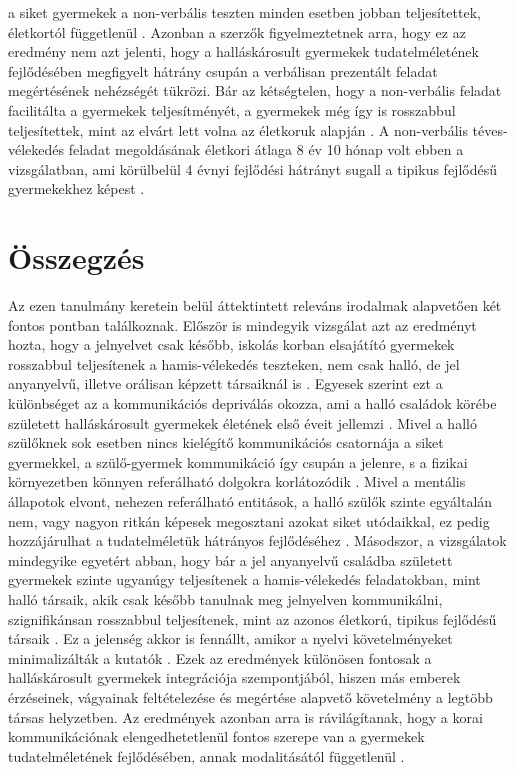 a siket gyermekek a non-verbális teszten minden esetben jobban teljesítettek, életkortól
függetlenül \autocite{figueras-costa_harris_2001}. Azonban a szerzők figyelmeztetnek arra, hogy ez az eredmény nem azt
jelenti, hogy a halláskárosult gyermekek tudatelméletének fejlődésében megfigyelt hátrány
csupán a verbálisan prezentált feladat megértésének nehézségét tükrözi. Bár az kétségtelen,
hogy a non-verbális feladat facilitálta a gyermekek teljesítményét, a gyermekek még így is
rosszabbul teljesítettek, mint az elvárt lett volna az életkoruk alapján \autocite{figueras-costa_harris_2001}. A non-verbális
téves-vélekedés feladat megoldásának életkori átlaga 8 év 10 hónap volt ebben a vizsgálatban,
ami körülbelül 4 évnyi fejlődési hátrányt sugall a tipikus fejlődésű gyermekekhez képest
\autocite{figueras-costa_harris_2001}.

\pagebreak

\section*{Összegzés}

Az ezen tanulmány keretein belül áttektintett releváns irodalmak alapvetően két fontos
pontban találkoznak. Először is mindegyik vizsgálat azt az eredményt hozta, hogy a jelnyelvet
csak később, iskolás korban elsajátító gyermekek rosszabbul teljesítenek a hamis-vélekedés
teszteken, nem csak halló, de jel anyanyelvű, illetve orálisan képzett társaiknál is \autocite{peterson_slaughter_2006,woolfe_want_siegal_2002,peterson_siegal_1999}.
Egyesek szerint ezt a különbséget az a kommunikációs depriválás okozza, ami a halló
családok körébe született halláskárosult gyermekek életének első éveit jellemzi \autocite{perner_leekam_wimmer_1987}. Mivel a
halló szülőknek sok esetben nincs kielégítő kommunikációs csatornája a siket gyermekkel, a
szülő-gyermek kommunikáció így csupán a jelenre, s a fizikai környezetben könnyen
referálható dolgokra korlátozódik \autocite{peterson_siegal_2000}. Mivel a mentális állapotok elvont, nehezen
referálható entitások, a halló szülők szinte egyáltalán nem, vagy nagyon ritkán képesek
megosztani azokat siket utódaikkal, ez pedig hozzájárulhat a tudatelméletük hátrányos
fejlődéséhez \autocite{peterson_siegal_2000}. Másodszor, a vizsgálatok mindegyike egyetért abban, hogy bár a
jel anyanyelvű családba született gyermekek szinte ugyanúgy teljesítenek a hamis-vélekedés
feladatokban, mint halló társaik, akik csak később tanulnak meg jelnyelven kommunikálni,
szignifikánsan rosszabbul teljesítenek, mint az azonos életkorú, tipikus fejlődésű társaik \autocite{peterson_slaughter_2006,woolfe_want_siegal_2002,peterson_siegal_1999}.
Ez a jelenség akkor is fennállt, amikor a nyelvi követelményeket minimalizálták a kutatók
\autocite{figueras-costa_harris_2001}. Ezek az eredmények különösen fontosak a halláskárosult gyermekek integrációja
szempontjából, hiszen más emberek érzéseinek, vágyainak feltételezése és megértése alapvető
követelmény a legtöbb társas helyzetben. Az eredmények azonban arra is rávilágítanak, hogy
a korai kommunikációnak elengedhetetlenül fontos szerepe van a gyermekek
tudatelméletének fejlődésében, annak modalitásától függetlenül \autocite{peterson_2004}.